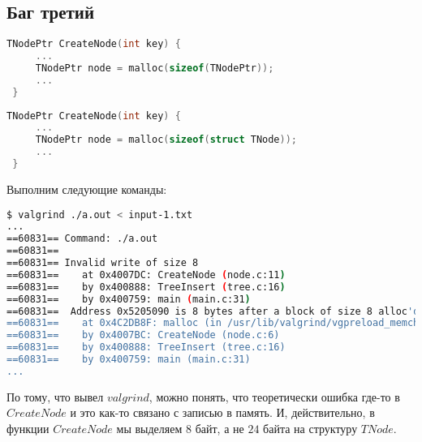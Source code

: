 \documentclass[12pt]{article}
\begin{document}
\subsection{Баг третий}
\begin{lstlisting}[language=C, backgroundcolor=\color{myred}]
 TNodePtr CreateNode(int key) {
     ...
     TNodePtr node = malloc(sizeof(TNodePtr));
     ...
 }
\end{lstlisting}
\begin{lstlisting}[language=C, caption=node.c, captionpos=b, backgroundcolor=\color{mygreen}]
 TNodePtr CreateNode(int key) {
     ...
     TNodePtr node = malloc(sizeof(struct TNode));
     ...
 }
\end{lstlisting}
Выполним следующие команды:
\begin{lstlisting}[language=bash, frame=L]
$ valgrind ./a.out < input-1.txt
...
==60831== Command: ./a.out
==60831== 
==60831== Invalid write of size 8
==60831==    at 0x4007DC: CreateNode (node.c:11)
==60831==    by 0x400888: TreeInsert (tree.c:16)
==60831==    by 0x400759: main (main.c:31)
==60831==  Address 0x5205090 is 8 bytes after a block of size 8 alloc'd
==60831==    at 0x4C2DB8F: malloc (in /usr/lib/valgrind/vgpreload_memcheck-amd64-linux.so)
==60831==    by 0x4007BC: CreateNode (node.c:6)
==60831==    by 0x400888: TreeInsert (tree.c:16)
==60831==    by 0x400759: main (main.c:31)
...
\end{lstlisting}
По тому, что вывел $valgrind$, можно понять, что теоретически ошибка где-то в $CreateNode$ и это как-то связано с записью в память.
\newline
\newline
И, действительно, в функции $CreateNode$ мы выделяем $8$ байт, а не $24$ байта на структуру $TNode$.
\newpage
\end{document}
